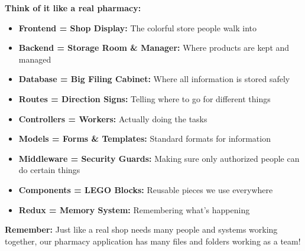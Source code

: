 \documentclass[12pt]{article}
\begin{document}
\textbf{Think of it like a real pharmacy:}
\begin{itemize}
    \item \textbf{Frontend = Shop Display:} The colorful store people walk into
    \item \textbf{Backend = Storage Room \& Manager:} Where products are kept and managed
    \item \textbf{Database = Big Filing Cabinet:} Where all information is stored safely
    \item \textbf{Routes = Direction Signs:} Telling where to go for different things
    \item \textbf{Controllers = Workers:} Actually doing the tasks
    \item \textbf{Models = Forms \& Templates:} Standard formats for information
    \item \textbf{Middleware = Security Guards:} Making sure only authorized people can do certain things
    \item \textbf{Components = LEGO Blocks:} Reusable pieces we use everywhere
    \item \textbf{Redux = Memory System:} Remembering what's happening
\end{itemize}

\textbf{Remember:} Just like a real shop needs many people and systems working together, our pharmacy application has many files and folders working as a team!
\end{document}
